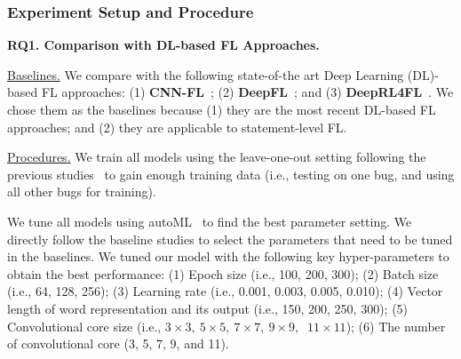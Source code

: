 \subsubsection{Experiment Setup and Procedure}

{\bf RQ1. Comparison with DL-based FL Approaches.}

\underline{Baselines.}
We compare {\tool} with the following state-of-the art Deep Learning
(DL)-based FL approaches: (1) \textbf{CNN-FL}~\cite{zhang2019cnn}; (2)
{\bf DeepFL}~\cite{DeepFL}; and (3) {\bf DeepRL4FL}~\cite{icse21-fl}.
We chose them as the baselines because (1) they are the most recent
DL-based FL approaches; and (2) they are applicable to statement-level
FL.


\underline{Procedures.}
We train all models using the leave-one-out setting following the
previous studies~\cite{DeepFL, TraPT} to gain enough training data
(i.e., testing on one bug, and using all other bugs for
training).




We tune all models using autoML~\cite{NNI} to find the best parameter
setting. We directly follow the baseline studies to select the
parameters that need to be tuned in the baselines.
We tuned our model with the following key hyper-parameters to obtain
the best performance: (1) Epoch size (i.e., 100, 200, 300); (2) Batch
size (i.e., 64, 128, 256); (3) Learning rate (i.e., 0.001, 0.003,
0.005, 0.010); (4) Vector length of word representation and its output
(i.e., 150, 200, 250, 300); (5) Convolutional core size (i.e.,
$3\times3,\:5\times5,\:7\times7,\:9\times9,$ $\:11\times11$); (6)
The number of convolutional core (3, 5, 7, 9, and 11).

